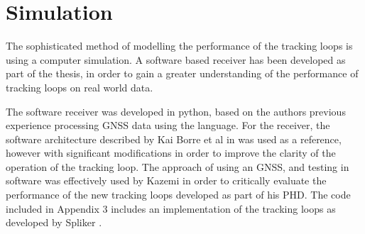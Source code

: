 \begin{comment}
The results of this analysis can be seen in figure \ref{fig:RootLocus}, from this analysis of the root locus, we can determine  that the system is stable, for values of the \ac{VCO} gain which are larger than 0.38. This is an important result, as intuitively, increasing the gain will typically make a system unstable. However, this result demonstrates the value of Root Locus analysis for evaluating the stability of a higher order system.

In order to verify the implementation of the analog model was correct, a second graphical model was constructed in CircuitLab. This model can be seen in figure \ref{fig:gpsLoopModel}. By adjusting the VCO gain, the threshold between stable and unstable behaviour for a step input was confirmed to be 0.38. The results from this experiment can be seen in figures \ref{fig:Stable} and \ref{fig:Unstable}

Additionally, this model confirmed that the current\ac{NAMURU} architecture is able to integrate up velocity and acceleration however it is vulnerable to Jerk. This was assessed by applying ramp and parabolic inputs to the input, and comparing to the output.
\end{comment}

\section{Simulation}

The sophisticated method of modelling the performance of the tracking loops is using a computer simulation. A software based receiver has been developed as part of the thesis, in order to gain a greater understanding of the performance of tracking loops on real world data. 

The software receiver was developed in python, based on the authors previous experience processing GNSS data using the language. For the receiver, the software architecture described by Kai Borre et al in \cite{KaiBorre} was used as a reference, however with significant modifications in order to improve the clarity of the operation of the tracking loop. The approach of using an \ac{GNSS}, and testing in software was effectively used by Kazemi \cite{KazemiPHD} in order to critically evaluate the performance of the new tracking loops developed as part of his PHD. The code included in Appendix 3 includes an implementation of the tracking loops as developed by Spliker \cite{Spilker}.

